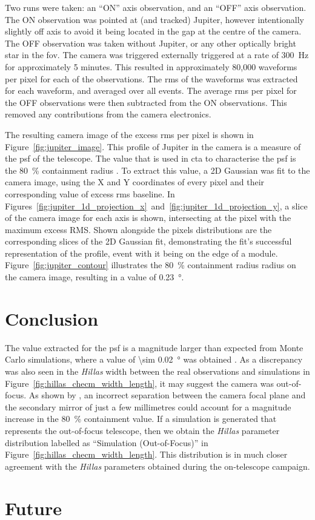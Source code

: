 Two runs were taken: an ``ON'' axis observation, and an ``OFF'' axis observation. The ON observation was pointed at (and tracked) Jupiter, however intentionally slightly off axis to avoid it being located in the gap at the centre of the camera. The OFF observation was taken without Jupiter, or any other optically bright star in the \gls{fov}. The camera was triggered externally triggered at a rate of \SI{300}{Hz} for approximately 5 minutes. This resulted in approximately 80,000 waveforms per pixel for each of the observations. The \gls{rms} of the waveforms was extracted for each waveform, and averaged over all events. The average \gls{rms} per pixel for the OFF observations were then subtracted from the ON observations. This removed any contributions from the camera electronics. 

The resulting camera image of the excess \gls{rms} per pixel is shown in Figure~\ref{fig:jupiter_image}. This profile of Jupiter in the camera is a measure of the \gls{psf} of the telescope. The value that is used in \gls{cta} to characterise the \gls{psf} is the \SI{80}{\percent} containment radius \cite{Armstrong2015,Rulten2016}. To extract this value, a 2D Gaussian was fit to the camera image, using the X and Y coordinates of every pixel and their corresponding value of excess \gls{rms} baseline. In Figures~\ref{fig:jupiter_1d_projection_x}~and~\ref{fig:jupiter_1d_projection_y}, a slice of the camera image for each axis is shown, intersecting at the pixel with the maximum excess RMS. Shown alongside the pixels distributions are the corresponding slices of the 2D Gaussian fit, demonstrating the fit's successful representation of the profile, event with it being on the edge of a module. Figure~\ref{fig:jupiter_contour} illustrates the \SI{80}{\percent} containment radius radius on the camera image, resulting in a value of \SI{0.23}{\degree}. 

\section{Conclusion}

The value extracted for the \gls{psf} is a magnitude larger than expected from Monte Carlo simulations, where a value of \SI{\sim 0.02}{\degree} was obtained \cite{Armstrong2015}. As a discrepancy was also seen in the \textit{Hillas} width between the real observations and simulations in Figure~\ref{fig:hillas_checm_width_length}, it may suggest the camera was out-of-focus. As shown by \textcite{Rulten2016}, an incorrect separation between the camera focal plane and the secondary mirror of just a few millimetres could account for a magnitude increase in the \SI{80}{\percent} containment value. If a simulation is generated that represents the out-of-focus telescope, then we obtain the \textit{Hillas} parameter distribution labelled as ``Simulation (Out-of-Focus)'' in Figure~\ref{fig:hillas_checm_width_length}. This distribution is in much closer agreement with the \textit{Hillas} parameters obtained during the on-telescope campaign. 

\section{Future}

